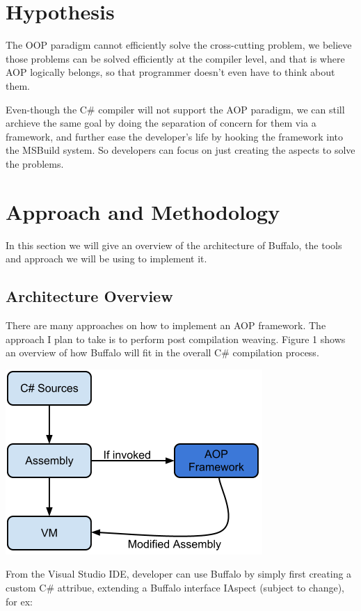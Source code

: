 \section{Hypothesis}
The OOP paradigm cannot efficiently solve the cross-cutting problem, we believe those problems can be solved efficiently at the compiler level, and that is where AOP logically belongs, so that programmer doesn't even have to think about them.

Even-though the C\# compiler will not support the AOP paradigm, we can still archieve the same goal by doing the separation of concern for them via a framework, and further ease the developer's life by hooking the framework into the MSBuild system. So developers can focus on just creating the aspects to solve the problems.

\section{Approach and Methodology}
In this section we will give an overview of the architecture of Buffalo, the tools and approach we will be using to implement it.

\subsection{Architecture Overview}
There are many approaches on how to implement an AOP framework. The approach I plan to take is to perform post compilation weaving. Figure 1 shows an overview of how Buffalo will fit in the overall C\# compilation process.

\includegraphics[scale=0.70]{model_overview.png}

From the Visual Studio IDE, developer can use Buffalo by simply first creating a custom C\# attribue, extending a Buffalo interface IAspect (subject to change), for ex:

